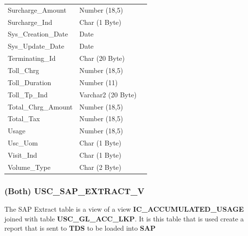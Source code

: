 \documentclass[12pt,twoside]{article}
\begin{document}
\begin{longtable}{l|l|l}
Surcharge\_Amount & Number (18,5) & \\
Surcharge\_Ind & Char (1 Byte) & \\
Sys\_Creation\_Date & Date & \\
Sys\_Update\_Date & Date & \\
Terminating\_Id & Char (20 Byte) & \\
Toll\_Chrg & Number (18,5) & \\
Toll\_Duration & Number (11) & \\
Toll\_Tp\_Ind & Varchar2 (20 Byte) & \\
Total\_Chrg\_Amount & Number (18,5) & \\
Total\_Tax & Number (18,5) & \\
Usage & Number (18,5) & \\
Usc\_Uom & Char (1 Byte) & \\
Visit\_Ind & Char (1 Byte) & \\
Volume\_Type & Char (2 Byte) & \\
\hline
\end{longtable}
\normalsize
\subsubsection{(Both) USC\_SAP\_EXTRACT\_V}
\label{sec:orgheadline131}
The SAP Extract table is a view of a view \textbf{IC\_ACCUMULATED\_USAGE} joined with table \textbf{USC\_GL\_ACC\_LKP}. It is this table that is used create a report that is sent to \textbf{TDS} to be loaded into \textbf{SAP}
\footnotesize
\end{document}
